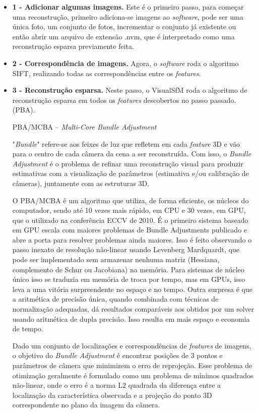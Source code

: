 \begin{itemize}
\item \textbf{1 - Adicionar algumas imagens.} Este é o primeiro passo, para começar uma reconstrução, primeiro adiciona-se imagens ao {\it software}, pode ser uma única foto, um conjunto de fotos, incrementar o conjunto já existente ou então abrir um arquivo de extensão .nvm, que é interpretado como uma reconstrução esparsa previamente feita.

\item \textbf{2 - Correspondência de imagens.} Agora, o {\it software} roda o algoritmo SIFT, realizando todas as correspondências entre os {\it features}.

\item \textbf{3 - Reconstrução esparsa.} Neste passo, o VisualSfM roda o algoritmo de reconstrução esparsa em todos os {\it features} descobertos no passo passado. (PBA). %


PBA/MCBA -- {\it Multi-Core Bundle Adjustment}

"\textit{Bundle}" refere-se aos feixes de luz que refletem em cada {\it feature} 3D e vão para o centro de cada câmera da cena a ser reconstruída. Com isso, o {\it Bundle Adjustment} é o problema de refinar uma reconstrução visual para produzir estimativas com a visualização de parâmetros (estimativa e/ou calibração de câmeras), juntamente com as estruturas 3D.

O PBA/MCBA é um algoritmo que utiliza, de forma eficiente, os núcleos do computador, sendo até 10 vezes mais rápido, em CPU e 30 vezes, em GPU, que o utilizado na conferência ECCV de 2010. É o primeiro sistema baseado em GPU escala com maiores problemas de Bundle Adjustments publicado e abre a porta para resolver problemas ainda maiores. Isso é feito observando o passo inexato de resolução não-linear usando Levenberg Mardquardt, que pode ser implementado sem armazenar nenhuma matriz (Hessiana, complemento de Schur ou Jacobiana) na memória. Para sistemas de núcleo único isso se traduzia em memória de troca por tempo, mas em GPUs, isso leva a uma vitória surpreendente no espaço e no tempo. Outra surpresa é que a aritmética de precisão única, quando combinada com técnicas de normalização adequadas, dá resultados comparáveis aos obtidos por um solver usando aritmética de dupla precisão. Isso resulta em mais espaço e economia de tempo.

Dado um conjunto de localizações e correspondências de \textit{features} de imagens, o objetivo do \textit{Bundle Adjustment} é encontrar posições de 3 pontos e parâmetros de câmera que minimizem o erro de reprojeção. Esse problema de otimização geralmente é formulado como um problema de mínimos quadrados não-linear, onde o erro é a norma L2 quadrada da diferença entre a localização da característica observada e a projeção do ponto 3D correspondente no plano da imagem da câmera.


\end{itemize}
